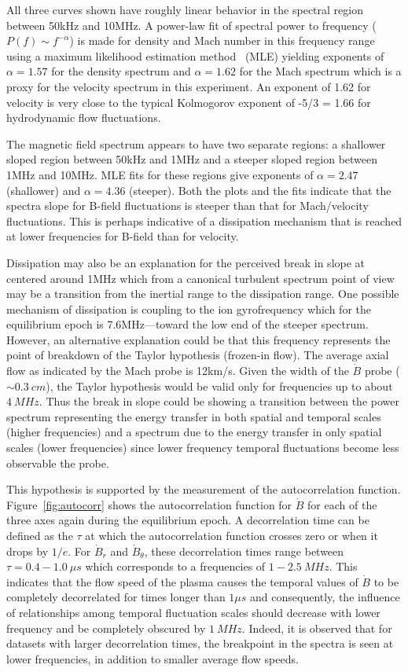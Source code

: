 \documentclass[12pt]{iopart}
\begin{document}
All three curves shown have roughly linear behavior in the spectral region between 50kHz and 10MHz. A power-law fit of spectral power to frequency ($P(f) \sim f^{-\alpha}$) is made for density and Mach number in this frequency range using a maximum likelihood estimation method~\cite{clauset09} (MLE) yielding exponents of $\alpha = 1.57$ for the density spectrum and $\alpha = 1.62$ for the Mach spectrum which is a proxy for the velocity spectrum in this experiment. An exponent of 1.62 for velocity is very close to the typical Kolmogorov exponent of -5/3 = 1.66 for hydrodynamic flow fluctuations.

The magnetic field spectrum appears to have two separate regions: a shallower sloped region between 50kHz and 1MHz and a steeper sloped region between 1MHz and 10MHz. MLE fits for these regions give exponents of $\alpha = 2.47$ (shallower) and $\alpha = 4.36$ (steeper). Both the plots and the fits indicate that the spectra slope for B-field fluctuations is steeper than that for Mach/velocity fluctuations. This is perhaps indicative of a dissipation mechanism that is reached at lower frequencies for B-field than for velocity.

Dissipation may also be an explanation for the perceived break in slope at centered around 1MHz which from a canonical turbulent spectrum point of view may be a transition from the inertial range to the dissipation range. One possible mechanism of dissipation is coupling to the ion gyrofrequency which for the equilibrium epoch is 7.6MHz---toward the low end of the steeper spectrum. However, an alternative explanation could be that this frequency represents the point of breakdown of the Taylor hypothesis (frozen-in flow). The average axial flow as indicated by the Mach probe is 12km/s. Given the width of the $\dot{B}$ probe ($\sim 0.3~cm$), the Taylor hypothesis would be valid only for frequencies up to about $4~MHz$. Thus the break in slope could be showing a transition between the power spectrum representing the energy transfer in both spatial and temporal scales (higher frequencies) and a spectrum due to the energy transfer in only spatial scales (lower frequencies) since lower frequency temporal fluctuations become less observable the probe. 

This hypothesis is supported by the measurement of the autocorrelation function. Figure~\ref{fig:autocorr} shows the autocorrelation function for $\dot{B}$ for each of the three axes again during the equilibrium epoch. A decorrelation time can be defined as the $\tau$ at which the autocorrelation function crosses zero or when it drops by $1/e$. For $\dot{B}_{r}$ and $\dot{B}_{\theta}$, these decorrelation times range between $\tau = 0.4-1.0~\mu s$ which corresponds to a frequencies of $1-2.5~MHz$. This indicates that the flow speed of the plasma causes the temporal values of $\dot{B}$ to be completely decorrelated for times longer than $1 \mu s$ and consequently, the influence of relationships among temporal fluctuation scales should decrease with lower frequency and be completely obscured by $1~MHz$. Indeed, it is observed that for datasets with larger decorrelation times, the breakpoint in the spectra is seen at lower frequencies, in addition to smaller average flow speeds.
\end{document}
